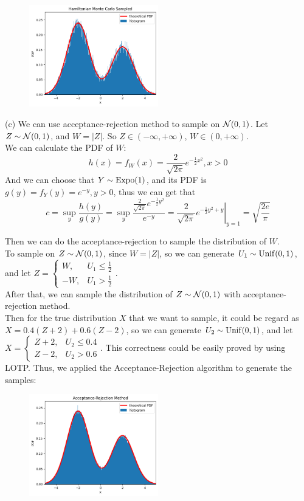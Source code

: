 \begin{homeworkProblem}
\begin{figure}[h]
    \includegraphics[width=0.5\textwidth]{./figure/p11/Hamiltonian.png}
\end{figure}

(c) We can use acceptance-rejection method to sample on $\mathcal{N}(0,1)$. Let $Z\sim \mathcal{N}(0,1)$, and $W=|Z|$. So $Z\in (-\infty,+\infty)$, $W\in (0,+\infty)$. \\
We can calculate the PDF of $W$:
$$h(x)=f_W(x)=\dfrac{2}{\sqrt{2\pi}}e^{-\frac{1}{2}x^2},x>0$$
And we can choose that $Y\sim\operatorname{Expo}(1)$, and its PDF is $g(y)=f_Y(y)=e^{-y},y>0$, thus we can get that
$$c = \sup_y\dfrac{h(y)}{g(y)}=\sup_y\dfrac{\frac{2}{\sqrt{2\pi}}e^{-\frac{1}{2}y^2}}{e^{-y}}=\left.\dfrac{2}{\sqrt{2\pi}}e^{-\frac{1}{2}y^2+y}\right|_{y=1}=\sqrt{\dfrac{2e}{\pi}}$$

Then we can do the acceptance-rejection to sample the distribution of $W$. \\
To sample on $Z\sim \mathcal{N}(0,1)$, since $W=|Z|$, so we can generate $U_1\sim\operatorname{Unif}(0,1)$, and let $Z=\begin{cases}
    W, & U_1\leq \frac{1}{2} \\
    -W, & U_1>\frac{1}{2}
\end{cases}$. \\
After that, we can sample the distribution of $Z\sim \mathcal{N}(0,1)$ with acceptance-rejection method. \\
Then for the true distribution $X$ that we want to sample, it could be regard as $X=0.4(Z+2)+0.6(Z-2)$, so we can generate $U_2\sim\operatorname{Unif}(0,1)$, and let $X=\begin{cases}
Z+2, & U_2\leq 0.4\\
Z-2, & U_2>0.6
\end{cases}$. This correctness could be easily proved by using LOTP. Thus, we applied the Acceptance-Rejection algorithm to generate the samples:
\begin{figure}[h]
    \centering
    \includegraphics[width=0.5\textwidth]{./figure/p11/accept_reject.png}
\end{figure}


\end{homeworkProblem}
